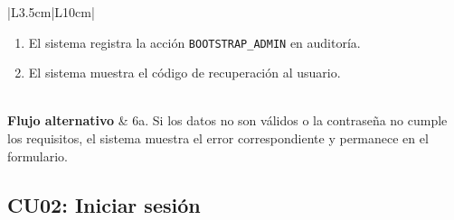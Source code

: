 \documentclass[11pt,a4paper]{article}
\begin{document}
\begin{longtable}{|L{3.5cm}|L{10cm}|}
\begin{enumerate}
        \item El sistema registra la acción \texttt{BOOTSTRAP\_ADMIN} en auditoría.
        \item El sistema muestra el código de recuperación al usuario.
    \end{enumerate}                                                    \\ \hline
    \textbf{Flujo alternativo} & 6a. Si los datos no son válidos o la contraseña no cumple los requisitos, el sistema muestra el error correspondiente y permanece en el formulario.        \\ \hline
\end{longtable}

\subsection*{CU02: Iniciar sesión}
\end{document}
